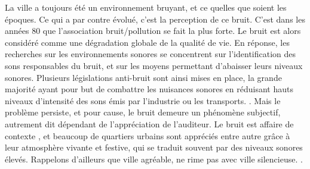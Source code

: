 La ville a toujours été un environnement bruyant, et ce quelles que soient les époques. Ce qui a par contre évolué, c'est la perception de ce bruit. C'est dans les années 80 que l'association bruit/pollution se fait la plus forte. Le bruit est alors considéré comme une dégradation globale de la qualité de vie. En réponse, les recherches sur les environnements sonores se concentrent sur l'identification des sons responsables du bruit, et sur les moyens permettant d'abaisser leurs niveaux sonores. Plusieurs législations anti-bruit sont ainsi mises en place, la grande majorité ayant pour but de combattre les nuisances sonores en réduisant hauts niveaux d'intensité des sons émis par l'industrie ou les transports.
.
Mais le problème persiste, et pour cause, le bruit demeure un phénomène subjectif, autrement dit dépendant de l'appréciation de l'auditeur. Le bruit est affaire de contexte , et beaucoup de quartiers urbains sont appréciés entre autre grâce à leur atmosphère vivante et festive, qui se traduit souvent par des niveaux sonores élevés. Rappelons d'ailleurs que ville agréable, ne rime pas avec ville silencieuse. .


